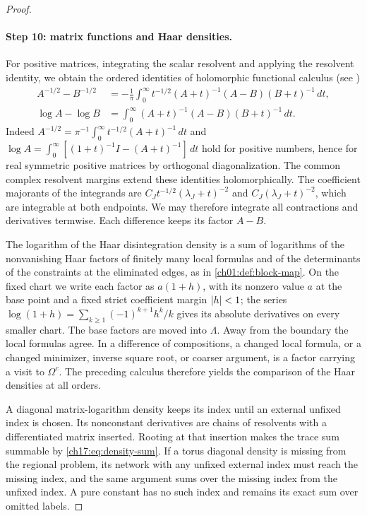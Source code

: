 \begin{proof}
\paragraph{Step 10: matrix functions and Haar densities.}
For positive matrices, integrating the scalar resolvent and applying the resolvent identity, we obtain the ordered identities of holomorphic functional calculus (see \cite{Bhatia1997})
\begin{align}
 A^{-1/2}-B^{-1/2}&=-\frac1\pi\int_0^\infty t^{-1/2}(A+t)^{-1}(A-B)(B+t)^{-1}\,dt,\label{ch17:eq:square-root}\\
 \log A-\log B&=\int_0^\infty(A+t)^{-1}(A-B)(B+t)^{-1}\,dt.\label{ch17:eq:log-difference}
\end{align}
Indeed $A^{-1/2}=\pi^{-1}\int_0^\infty t^{-1/2}(A+t)^{-1}\,dt$ and $\log A=\int_0^\infty[(1+t)^{-1}I-(A+t)^{-1}]\,dt$ hold for positive numbers, hence for real symmetric positive matrices by orthogonal diagonalization. The common complex resolvent margins extend these identities holomorphically. The coefficient majorants of the integrands are $C_Jt^{-1/2}(\lambda_J+t)^{-2}$ and $C_J(\lambda_J+t)^{-2}$, which are integrable at both endpoints. We may therefore integrate all contractions and derivatives termwise. Each difference keeps its factor $A-B$.

The logarithm of the Haar disintegration density is a sum of logarithms of the nonvanishing Haar factors of finitely many local formulas and of the determinants of the constraints at the eliminated edges, as in \cref{ch01:def:block-map}. On the fixed chart we write each factor as $a(1+h)$, with its nonzero value $a$ at the base point and a fixed strict coefficient margin $\lvert h\rvert<1$; the series $\log(1+h)=\sum_{k\ge1}(-1)^{k+1}h^k/k$ gives its absolute derivatives on every smaller chart. The base factors are moved into $\Lambda$. Away from the boundary the local formulas agree. In a difference of compositions, a changed local formula, or a changed minimizer, inverse square root, or coarser argument, is a factor carrying a visit to $\Omega^c$. The preceding calculus therefore yields the comparison of the Haar densities at all orders.

A diagonal matrix-logarithm density keeps its index until an external unfixed index is chosen. Its nonconstant derivatives are chains of resolvents with a differentiated matrix inserted. Rooting at that insertion makes the trace sum summable by \eqref{ch17:eq:density-sum}. If a torus diagonal density is missing from the regional problem, its network with any unfixed external index must reach the missing index, and the same argument sums over the missing index from the unfixed index. A pure constant has no such index and remains its exact sum over omitted labels.


\end{proof}
